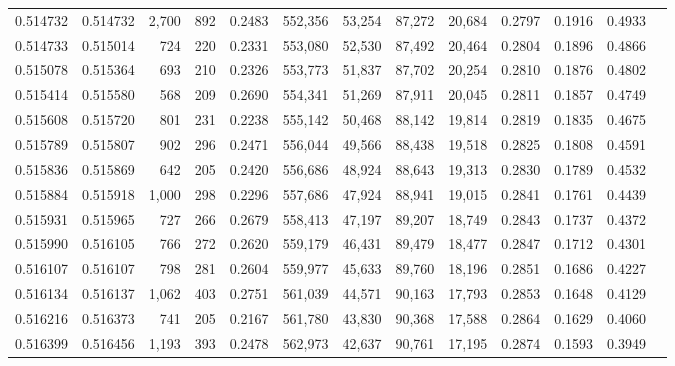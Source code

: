 \begin{tabular}{rrrrrrrrrrrrr}
0.514732 & 0.514732 &  2,700 &   892 &                                     0.2483 & 552,356 &  53,254 &  87,272 &  20,684 & 0.2797 & 0.1916 & 0.4933 \\
0.514733 & 0.515014 &    724 &   220 &                                     0.2331 & 553,080 &  52,530 &  87,492 &  20,464 & 0.2804 & 0.1896 & 0.4866 \\
0.515078 & 0.515364 &    693 &   210 &                                     0.2326 & 553,773 &  51,837 &  87,702 &  20,254 & 0.2810 & 0.1876 & 0.4802 \\
0.515414 & 0.515580 &    568 &   209 &                                     0.2690 & 554,341 &  51,269 &  87,911 &  20,045 & 0.2811 & 0.1857 & 0.4749 \\
0.515608 & 0.515720 &    801 &   231 &                                     0.2238 & 555,142 &  50,468 &  88,142 &  19,814 & 0.2819 & 0.1835 & 0.4675 \\
0.515789 & 0.515807 &    902 &   296 &                                     0.2471 & 556,044 &  49,566 &  88,438 &  19,518 & 0.2825 & 0.1808 & 0.4591 \\
0.515836 & 0.515869 &    642 &   205 &                                     0.2420 & 556,686 &  48,924 &  88,643 &  19,313 & 0.2830 & 0.1789 & 0.4532 \\
0.515884 & 0.515918 &  1,000 &   298 &                                     0.2296 & 557,686 &  47,924 &  88,941 &  19,015 & 0.2841 & 0.1761 & 0.4439 \\
0.515931 & 0.515965 &    727 &   266 &                                     0.2679 & 558,413 &  47,197 &  89,207 &  18,749 & 0.2843 & 0.1737 & 0.4372 \\
0.515990 & 0.516105 &    766 &   272 &                                     0.2620 & 559,179 &  46,431 &  89,479 &  18,477 & 0.2847 & 0.1712 & 0.4301 \\
0.516107 & 0.516107 &    798 &   281 &                                     0.2604 & 559,977 &  45,633 &  89,760 &  18,196 & 0.2851 & 0.1686 & 0.4227 \\
0.516134 & 0.516137 &  1,062 &   403 &                                     0.2751 & 561,039 &  44,571 &  90,163 &  17,793 & 0.2853 & 0.1648 & 0.4129 \\
0.516216 & 0.516373 &    741 &   205 &                                     0.2167 & 561,780 &  43,830 &  90,368 &  17,588 & 0.2864 & 0.1629 & 0.4060 \\
0.516399 & 0.516456 &  1,193 &   393 &                                     0.2478 & 562,973 &  42,637 &  90,761 &  17,195 & 0.2874 & 0.1593 & 0.3949 \\

\end{tabular}
